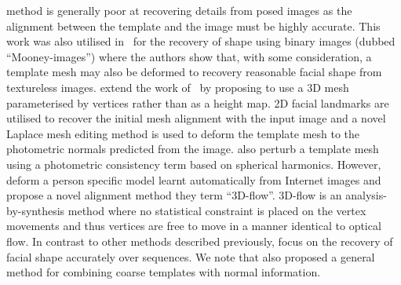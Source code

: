 method is generally poor at recovering details from posed images as the
alignment between the template and the image must be highly accurate. This work
was also utilised in~\cite{kemelmacher2008mooney} for the recovery of shape
using binary images (dubbed ``Mooney-images'') where the authors show that, with
some consideration, a template mesh may also be deformed to recovery reasonable
facial shape from textureless images.
\citet{roth2015unconstrained} extend the work of~\cite{kemelmacher2011facereconstruction}
by proposing to use a 3D mesh parameterised by vertices rather than as a height
map. 2D facial landmarks are utilised to recover the initial mesh alignment with
the input image and a novel Laplace mesh editing method is used to deform the
template mesh to the photometric normals predicted from the image.
\citet{Suwajanakorn:2014bl} also perturb a template mesh using a photometric
consistency term based on spherical harmonics.
However, \citet{Suwajanakorn:2014bl} deform a person
specific model learnt automatically from Internet images and propose a novel
alignment method they term ``3D-flow''. 3D-flow is an analysis-by-synthesis
method where no statistical constraint is placed on the vertex movements
and thus vertices are free to move in a manner identical to optical flow. In
contrast to other methods described previously, \citet{Suwajanakorn:2014bl}
focus on the recovery of facial shape accurately over sequences.
We note that \citet{nehab2005efficiently} also proposed a general method
for combining coarse templates with normal information.

